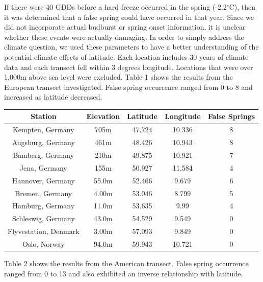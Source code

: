 \documentclass{article}\usepackage[]{graphicx}\usepackage[]{color}
\begin{document}
If there were 40 GDDs before a hard freeze occurred in the spring (-2.2$^{\circ}$C), then it was determined that a false spring could have occurred in that year. Since we did not incorporate actual budburst or spring onset information, it is unclear whether these events were actually damaging. In order to simply address the climate question, we used these parameters to have a better understanding of the potential climate effects of latitude.  %
Each location includes 30 years of climate data and each transect fell within 3 degrees longitude. Locations that were over 1,000m above sea level were excluded. Table 1 shows the results from the European transect investigated. False spring occurrence ranged from 0 to 8 and increased as latitude decreased. 

\begin{center}
 \label{tab:title} 
\begin{tabular}{c c c c c}
\hline
Station & Elevation & Latitude & Longitude & False Springs \\
\hline
Kempten, Germany & 705m & 47.724 & 10.336 & 8 \\
Augsburg, Germany & 461m & 48.426 & 10.943 & 8 \\
Bamberg, Germany & 210m & 49.875 & 10.921 & 7 \\
Jena, Germany & 155m & 50.927 & 11.584 & 4 \\
Hannover, Germany & 55.0m & 52.466 & 9.679 & 6 \\
Bremen, Germany & 4.00m & 53.046 & 8.799 & 5 \\
Hamburg, Germany & 11.0m & 53.635 & 9.99 & 4 \\
Schleswig, Germany & 43.0m & 54.529 & 9.549 & 0 \\
Flyvestation, Denmark & 3.00m & 57.093 & 9.849 & 0 \\
Oslo, Norway & 94.0m & 59.943 & 10.721 & 0 \\
\hline
\end{tabular}
\end{center}

Table 2 shows the results from the American transect. False spring occurrence ranged from 0 to 13 and also exhibited an inverse relationship with latitude. 
\end{document}
